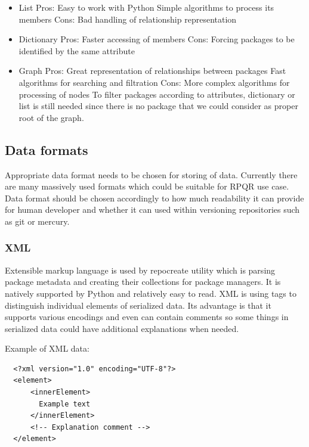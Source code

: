 \newpage

\begin{itemize}
  \item List
    \subitem Pros:
    \subsubitem Easy to work with Python
    \subsubitem Simple algorithms to process its members
    \subitem Cons:
    \subsubitem Bad handling of relationship representation
  \item Dictionary
    \subitem Pros:
    \subsubitem Faster accessing of members
    \subitem Cons:
    \subsubitem Forcing packages to be identified by the same attribute
  \item Graph
    \subitem Pros:
    \subsubitem Great representation of relationships between packages
    \subsubitem Fast algorithms for searching and filtration
    \subitem Cons:
    \subsubitem More complex algorithms for processing of nodes
    \subsubitem To filter packages according to attributes, dictionary or list is still needed
                since there is no package that we could consider as proper root of the graph.
\end{itemize}

\subsection*{Data formats}
Appropriate data format needs to be chosen for storing of data. Currently there are many massively
used formats which could be suitable for RPQR use case. Data format should be chosen accordingly to
how much readability it can provide for human developer and whether it can used within versioning
repositories such as git or mercury.

\subsubsection*{XML}
Extensible markup language\cite{XMLFormat} is used by repocreate utility which is parsing package metadata and creating
their collections for package managers. It is natively supported by Python and relatively easy to
read. XML is using tags to distinguish individual elements of serialized data. Its advantage
is that it supports various encodings and even can contain comments so some things in serialized
data could have additional explanations when needed.

\newpage

Example of XML data:
\begin{lstlisting}
  <?xml version="1.0" encoding="UTF-8"?>
  <element>
      <innerElement>
        Example text
      </innerElement>
      <!-- Explanation comment -->
  </element>
\end{lstlisting}

